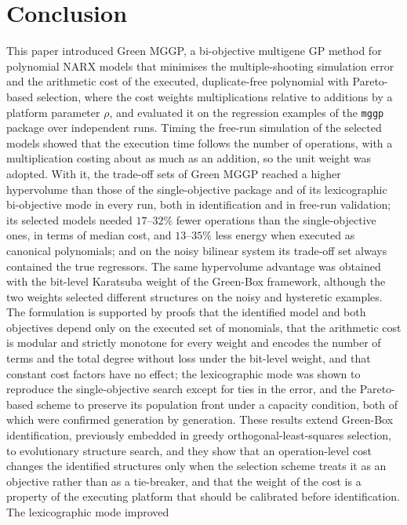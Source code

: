 \section{Conclusion}\label{sec:conclusion}

This paper introduced Green MGGP, a bi-objective multigene GP method for polynomial NARX models that minimises the
multiple-shooting simulation error and the arithmetic cost of the executed, duplicate-free polynomial with
Pareto-based selection, where the cost weights multiplications relative to additions by a platform parameter $\rho$,
and evaluated it on the regression examples of the \texttt{mggp} package over \nSeeds{} independent runs. Timing the
free-run simulation of the selected models showed that the execution time follows the number of operations, with a
multiplication costing about as much as an addition, so the unit weight was adopted. With it, the trade-off sets of
Green MGGP reached a higher hypervolume than those of the single-objective package and of its lexicographic
bi-objective mode in every run, both in identification and in free-run validation; its selected models needed
$17$--$32\%$ fewer operations than the single-objective ones, in terms of median cost, and $13$--$35\%$ less energy when
executed as canonical polynomials; and on the noisy bilinear system its trade-off set always contained the true
regressors. The same hypervolume advantage was obtained with the bit-level Karatsuba weight of the Green-Box framework,
although the two weights selected different structures on the noisy and hysteretic examples. The formulation is
supported by proofs that the identified model and both objectives depend only on the executed set of monomials, that
the arithmetic cost is modular and strictly monotone for every weight and encodes the number of terms and the total
degree without loss under the bit-level weight, and that constant cost factors have no effect; the lexicographic mode
was shown to reproduce the single-objective search except for ties in the error, and the Pareto-based scheme to
preserve its population front under a capacity condition, both of which were confirmed generation by generation.
These results extend Green-Box identification, previously embedded in greedy orthogonal-least-squares selection, to
evolutionary structure search, and they show that an operation-level cost changes the identified structures only when
the selection scheme treats it as an objective rather than as a tie-breaker, and that the weight of the cost is a
property of the executing platform that should be calibrated before identification. The lexicographic mode improved
